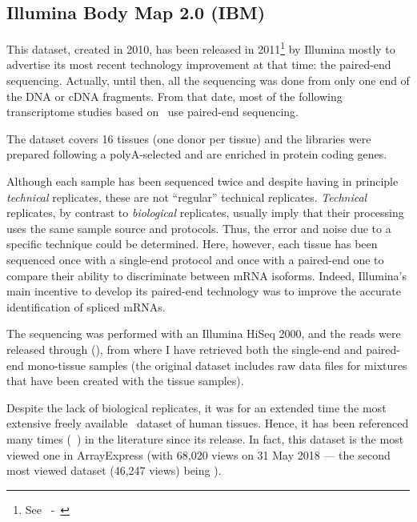 \subsection{Illumina Body Map 2.0 (IBM)}\label{subsec:ibmpresentation}
\vspace*{-0.2in}
This dataset, created in 2010, has been released in
2011\footnote{See~ -~\cite{ibmEnsembl}} by Illumina
mostly to advertise its most recent technology improvement at that time:
the paired-end sequencing. Actually, until then, all the sequencing was done
from only one end of the \gls{DNA} or \gls{cDNA} fragments. From that
date, most of the following transcriptome studies based on \Rnaseq\ use
paired-end sequencing.

The dataset covers 16 tissues (one donor per tissue) and
the libraries were prepared following a polyA-selected
and are enriched in protein coding genes.

Although each sample has been sequenced twice and despite having in principle
\emph{technical} replicates, these are not ``regular'' technical replicates.
\emph{Technical} replicates, by contrast to \emph{biological} replicates,
usually imply that their processing uses the same sample source and protocols.
Thus, the error and noise due to a specific technique could be determined.
Here, however, each tissue has been sequenced once with a single-end protocol
and once with a paired-end one to compare their ability to discriminate between
\gls{mRNA} isoforms.
Indeed, Illumina's main incentive to develop its paired-end
technology was to improve the accurate identification of spliced \glspl{mRNA}.

The sequencing was performed with an Illumina HiSeq 2000, and the reads were
released through  (),
from where I have retrieved both the single-end and paired-end mono-tissue samples
(the original dataset includes raw data files for mixtures
that have been created with the tissue samples).

Despite the lack of biological replicates,
it was for an extended time
the most extensive freely available \Rnaseq\ dataset of human tissues.
Hence, it has been referenced many times
(\eg\ \citet{Asmann2012-in,ibmrelatedpaper,Smith2012-jw,Derrien2012-ej,%
Florea2013-in,tophat2,Kechavarzi2014-oi,Zhao2014-xj,Pasquali2014-zj,Corpas2014-ej,%
Petryszak2014-kj,Brown2015-co,Janes2015-wn,%
De_Simone2016-fb,Kern2016-dv,Iwakiri2016-sr,Yao2017-gj,Akers2018-cf})
in the literature since its release.
In fact, this dataset is the most viewed one in \gls{ArrayExpress}
(with 68,020 views on 31 May 2018 ---
the second most viewed dataset (46,247 views)
being ).

